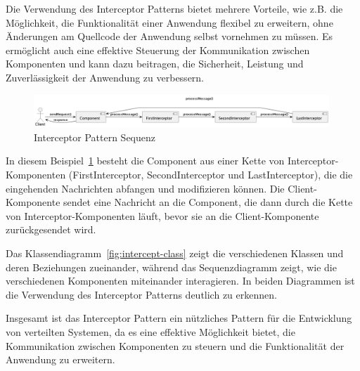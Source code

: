 Die Verwendung des Interceptor Patterns bietet mehrere Vorteile, wie z.B. die Möglichkeit, die Funktionalität einer Anwendung flexibel zu erweitern, ohne Änderungen am Quellcode der Anwendung selbst vornehmen zu müssen. Es ermöglicht auch eine effektive Steuerung der Kommunikation zwischen Komponenten und kann dazu beitragen, die Sicherheit, Leistung und Zuverlässigkeit der Anwendung zu verbessern.

\begin{figure}[!ht]
  \centering
  \includegraphics[width=0.99\textwidth]{fig/uml/intercept-seq.png}
  \caption{Interceptor Pattern Sequenz}
  \label{fig:intercept-seq}
\end{figure}

In diesem Beispiel~\ref{fig:intercept-seq} besteht die Component aus einer Kette von Interceptor-Komponenten (FirstInterceptor, SecondInterceptor und LastInterceptor), die die eingehenden Nachrichten abfangen und modifizieren können. Die Client-Komponente sendet eine Nachricht an die Component, die dann durch die Kette von Interceptor-Komponenten läuft, bevor sie an die Client-Komponente zurückgesendet wird.

Das Klassendiagramm~\ref{fig:intercept-class} zeigt die verschiedenen Klassen und deren Beziehungen zueinander, während das Sequenzdiagramm zeigt, wie die verschiedenen Komponenten miteinander interagieren. In beiden Diagrammen ist die Verwendung des Interceptor Patterns deutlich zu erkennen.

Insgesamt ist das Interceptor Pattern ein nützliches Pattern für die Entwicklung von verteilten Systemen, da es eine effektive Möglichkeit bietet, die Kommunikation zwischen Komponenten zu steuern und die Funktionalität der Anwendung zu erweitern.

